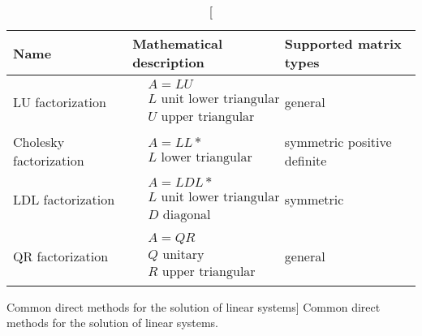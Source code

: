 \begin{table}[t]
\begin{center}
\begin{tabular}{lll}
Name & Mathematical description & Supported matrix types \\
\midrule
LU factorization & 
    $\begin{aligned}
        &A = LU\\[-0.4em]
        &L \text{ unit lower triangular}\\[-0.4em]
        &U \text{ upper triangular}
    \end{aligned}$ &
general \\[1.5em]
Cholesky factorization &
    $\begin{aligned}
        &A = LL*\\[-0.4em]
        &L \text{ lower triangular}
    \end{aligned}$ &
symmetric positive definite \\[1em]
LDL factorization &
    $\begin{aligned}
        &A = LDL*\\[-0.4em]
        &L \text{ unit lower triangular}\\[-0.4em]
        &D \text{ diagonal}
    \end{aligned}$ &
symmetric \\[1.5em]
QR factorization &
    $\begin{aligned}
        &A = QR\\[-0.4em]
        &Q \text{ unitary}\\[-0.4em]
        &R \text{ upper triangular}
    \end{aligned}$ &
general 
\end{tabular}
\end{center}
\caption
[Common direct methods for the solution of linear systems]
{Common direct methods for the solution of linear systems.}
\label{introduction:tab:direct-methods}
\end{table}

